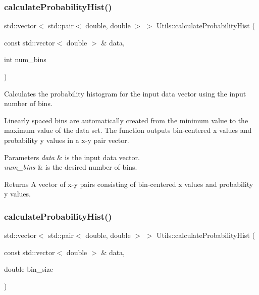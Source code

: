 \subsubsection{\texorpdfstring{calculate\+Probability\+Hist()}{calculateProbabilityHist()}\hspace{0.1cm}{\footnotesize\ttfamily [1/3]}}
{\footnotesize\ttfamily std\+::vector$<$ std\+::pair$<$ double, double $>$ $>$ Utils\+::calculate\+Probability\+Hist (\begin{DoxyParamCaption}\item[{const std\+::vector$<$ double $>$ \&}]{data,  }\item[{int}]{num\+\_\+bins }\end{DoxyParamCaption})}



Calculates the probability histogram for the input data vector using the input number of bins. 

Linearly spaced bins are automatically created from the minimum value to the maximum value of the data set. The function outputs bin-\/centered x values and probability y values in a x-\/y pair vector. 
\begin{DoxyParams}{Parameters}
{\em data} & is the input data vector. \\
\hline
{\em num\+\_\+bins} & is the desired number of bins. \\
\hline
\end{DoxyParams}
\begin{DoxyReturn}{Returns}
A vector of x-\/y pairs consisting of bin-\/centered x values and probability y values. 
\end{DoxyReturn}
\mbox{\label{namespace_utils_a0818230f8ad279ef7ca217f3cba81f76}} 
\subsubsection{\texorpdfstring{calculate\+Probability\+Hist()}{calculateProbabilityHist()}\hspace{0.1cm}{\footnotesize\ttfamily [2/3]}}
{\footnotesize\ttfamily std\+::vector$<$ std\+::pair$<$ double, double $>$ $>$ Utils\+::calculate\+Probability\+Hist (\begin{DoxyParamCaption}\item[{const std\+::vector$<$ double $>$ \&}]{data,  }\item[{double}]{bin\+\_\+size }\end{DoxyParamCaption})}



